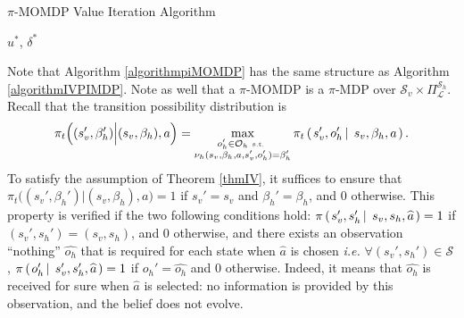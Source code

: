 \begin{algorithm} \caption{ $\pi$-MOMDP Value Iteration Algorithm} \label{algorithmpiMOMDP}
\Return $u^*$, $\delta^*$ \;
\end{algorithm}
Note that Algorithm \ref{algorithmpiMOMDP} has the same structure 
as Algorithm \ref{algorithmIVPIMDP}. 
Note as well that a $\pi$-MOMDP is a $\pi$-MDP 
over $\mathcal{S}_v \times \Pi^{\mathcal{S}_h}_{\mathcal{L}}$. 
Recall that the transition possibility distribution is
\[ \pi_t \Big( (s_v',\beta_h') \Big\vert (s_v,\beta_h), a  \Big) = \max_{\substack{ o_h' \in \mathcal{O}_h \mbox{ \tiny s.t. } \\ \nu_h(s_v,\beta_h,a,s_v',o_h') = \beta_h'}}
\pi_t \left( \left.  s_v',o_h' \, \right| \left. \, s_v, \beta_h, a  \right. \right). \]
To satisfy the assumption of Theorem \ref{thmIV}, 
it suffices to ensure that 
$\pi_t \Big( (s_v',\beta_h') \Big\vert (s_v,\beta_h), a  \Big) = 1$
if $s_v'=s_v$ and $\beta_h'=\beta_h$,
and $0$ otherwise.
This property is verified if the two following conditions hold: 
$\pi \left( \left.  s_v',s_h' \, \right| \left. \, s_v,s_h, \widehat{a}  \right. \right) = 1$ 
if $(s_v',s_h')=(s_v,s_h)$, and $0$ otherwise, 
and there exists an observation ``nothing'' $\widehat{o_h}$ 
that is required for each state when $\widehat{a}$ is chosen
\textit{i.e.} 
$\forall (s_v',s_h') \in \mathcal{S}$,
$\pi \left( \left.  o_h' \, \right| \left. \, s_v',s_h',\widehat{a} \right. \right) = 1$ if $o_h'=\widehat{o_h}$ and $0$ otherwise.
Indeed, it means that $\widehat{o_h}$ is received for sure when $\widehat{a}$ is selected:
no information is provided by this observation,
and the belief does not evolve. 

